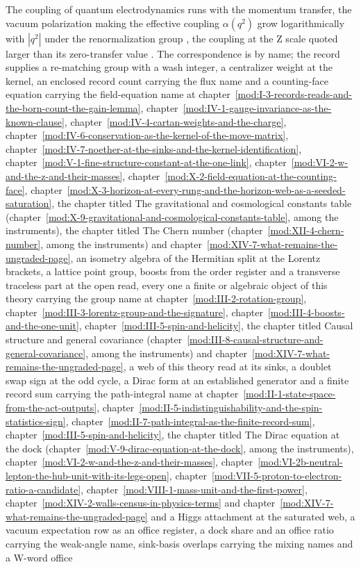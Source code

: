 \begin{chbridge}
The coupling of quantum electrodynamics runs with the momentum transfer, the vacuum polarization making the effective coupling $\alpha(q^{2})$ grow logarithmically with $|q^{2}|$ under the renormalization group \cite{GellMann1954}, the coupling at the Z scale quoted larger than its zero-transfer value \cite{Peskin1995}. The correspondence is by name; the record supplies a re-matching group with a wash integer, a centralizer weight at the kernel, an enclosed record count carrying the flux name and a counting-face equation carrying the field-equation name at chapter~\ref{mod:I-3-records-reads-and-the-born-count-the-gain-lemma}, chapter~\ref{mod:IV-1-gauge-invariance-as-the-known-clause}, chapter~\ref{mod:IV-4-cartan-weights-and-the-charge}, chapter~\ref{mod:IV-6-conservation-as-the-kernel-of-the-move-matrix}, chapter~\ref{mod:IV-7-noether-at-the-sinks-and-the-kernel-identification}, chapter~\ref{mod:V-1-fine-structure-constant-at-the-one-link}, chapter~\ref{mod:VI-2-w-and-the-z-and-their-masses}, chapter~\ref{mod:X-2-field-equation-at-the-counting-face}, chapter~\ref{mod:X-3-horizon-at-every-rung-and-the-horizon-web-as-a-seeded-saturation}, the chapter titled The gravitational and cosmological constants table (chapter~\ref{mod:X-9-gravitational-and-cosmological-constants-table}, among the instruments), the chapter titled The Chern number (chapter~\ref{mod:XII-4-chern-number}, among the instruments) and chapter~\ref{mod:XIV-7-what-remains-the-ungraded-page}, an isometry algebra of the Hermitian split at the Lorentz brackets, a lattice point group, boosts from the order register and a transverse traceless part at the open read, every one a finite or algebraic object of this theory carrying the group name at chapter~\ref{mod:III-2-rotation-group}, chapter~\ref{mod:III-3-lorentz-group-and-the-signature}, chapter~\ref{mod:III-4-boosts-and-the-one-unit}, chapter~\ref{mod:III-5-spin-and-helicity}, the chapter titled Causal structure and general covariance (chapter~\ref{mod:III-8-causal-structure-and-general-covariance}, among the instruments) and chapter~\ref{mod:XIV-7-what-remains-the-ungraded-page}, a web of this theory read at its sinks, a doublet swap sign at the odd cycle, a Dirac form at an established generator and a finite record sum carrying the path-integral name at chapter~\ref{mod:II-1-state-space-from-the-act-outputs}, chapter~\ref{mod:II-5-indistinguishability-and-the-spin-statistics-sign}, chapter~\ref{mod:II-7-path-integral-as-the-finite-record-sum}, chapter~\ref{mod:III-5-spin-and-helicity}, the chapter titled The Dirac equation at the dock (chapter~\ref{mod:V-9-dirac-equation-at-the-dock}, among the instruments), chapter~\ref{mod:VI-2-w-and-the-z-and-their-masses}, chapter~\ref{mod:VI-2b-neutral-lepton-the-hub-unit-with-its-legs-open}, chapter~\ref{mod:VII-5-proton-to-electron-ratio-a-candidate}, chapter~\ref{mod:VIII-1-mass-unit-and-the-first-power}, chapter~\ref{mod:XIV-2-walls-census-in-physics-terms} and chapter~\ref{mod:XIV-7-what-remains-the-ungraded-page} and a Higgs attachment at the saturated web, a vacuum expectation row as an office register, a dock share and an office ratio carrying the weak-angle name, sink-basis overlaps carrying the mixing names and a W-word office 
\end{chbridge}
